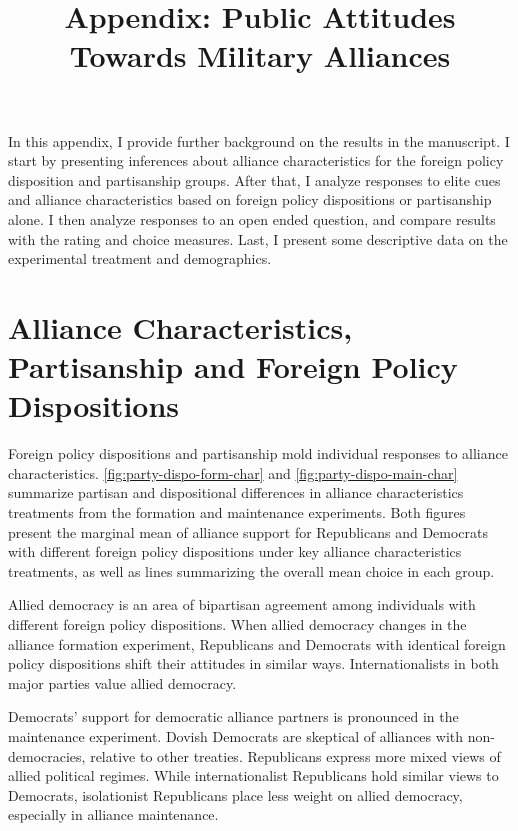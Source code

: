 \documentclass[12pt]{article}
\title{\textbf{Appendix: Public Attitudes Towards Military Alliances}}
\author{}
\date{}
\begin{document}
\maketitle 

\doublespace 


In this appendix, I provide further background on the results in the manuscript. 
I start by presenting inferences about alliance characteristics for the foreign policy disposition and partisanship groups. 
After that, I analyze responses to elite cues and alliance characteristics based on foreign policy dispositions or partisanship alone. 
I then analyze responses to an open ended question, and compare results with the rating and choice measures.
Last, I present some descriptive data on the experimental treatment and demographics. 


\tableofcontents


\newpage


\section{Alliance Characteristics, Partisanship and Foreign Policy Dispositions}



Foreign policy dispositions and partisanship mold individual responses to alliance characteristics. 
\autoref{fig:party-dispo-form-char} and \autoref{fig:party-dispo-main-char} summarize partisan and dispositional differences in alliance characteristics treatments from the formation and maintenance experiments. 
Both figures present the marginal mean of alliance support for Republicans and Democrats with different foreign policy dispositions under key alliance characteristics treatments, as well as lines summarizing the overall mean choice in each group. 


Allied democracy is an area of bipartisan agreement among individuals with different foreign policy dispositions.
When allied democracy changes in the alliance formation experiment, Republicans and Democrats with identical foreign policy dispositions shift their attitudes in similar ways. 
Internationalists in both major parties value allied democracy. 


Democrats' support for democratic alliance partners is pronounced in the maintenance experiment. 
Dovish Democrats are skeptical of alliances with non-democracies, relative to other treaties. 
Republicans express more mixed views of allied political regimes. 
While internationalist Republicans hold similar views to Democrats, isolationist Republicans place less weight on allied democracy, especially in alliance maintenance. 
\end{document}
